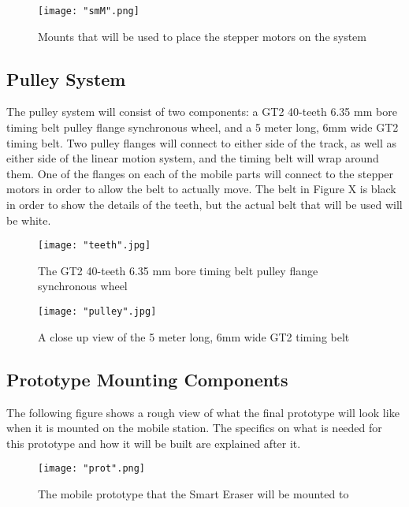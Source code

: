 \begin{figure}[H]
	\centering
	{\texttt{[image: "smM".png]}}
	\caption{  Mounts that will be used to place the stepper motors on the system
		\cite{smdataR}}
	\label{fig:smM}
\end{figure}

\subsection{Pulley System}
 The pulley system will consist of two components: a GT2 40-teeth 6.35 mm bore timing belt pulley flange synchronous wheel, and a 5 meter long, 6mm wide GT2 timing belt. Two pulley flanges will connect to either side of the track, as well as either side of the linear motion system, and the timing belt will wrap around them. One of the flanges on each of the mobile parts will connect to the stepper motors in order to allow the belt to actually move. The belt in Figure X is black in order to show the details of the teeth, but the actual belt that will be used will be white.

\begin{figure}[H]
	\centering
	{\texttt{[image: "teeth".jpg]}}
	\caption{  The GT2 40-teeth 6.35 mm bore timing belt pulley flange synchronous wheel
		\cite{smdataR}}
	\label{fig:teeth}
\end{figure}

\begin{figure}[H]
	\centering
	{\texttt{[image: "pulley".jpg]}}
	\caption{  A close up view of the 5 meter long, 6mm wide GT2 timing belt
		\cite{smdataR}}
	\label{fig:pulley}
\end{figure}

\subsection{Prototype Mounting Components}

The following figure shows a rough view of what the final prototype will look like when it is mounted on the mobile station. The specifics on what is needed for this prototype and how it will be built are explained after it.

\begin{figure}[H]
	\centering
	{\texttt{[image: "prot".png]}}
	\caption{  The mobile prototype that the Smart Eraser will be mounted to
		\cite{smdataR}}
	\label{fig:prot}
\end{figure}

